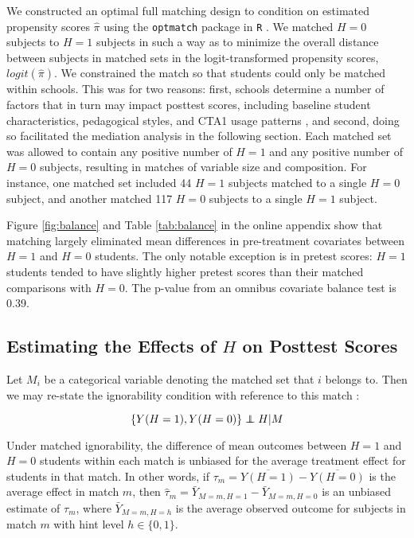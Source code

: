 \documentclass{article}\usepackage[]{graphicx}\usepackage[]{color}
\newenvironment{ass}[2][Assumption:]{\begin{trivlist}
\item[\hskip \labelsep {\bfseries #1}\hskip \labelsep {\bfseries #2}.]}{\end{trivlist}}
\def\independenT#1#2{\mathrel{\rlap{$#1#2$}\mkern2mu{#1#2}}}
\newcommand\independent{\protect\mathpalette{\protect\independenT}{\perp}}
\begin{document}
We constructed an optimal full matching design \citep{hansen2004} to
condition on estimated propensity scores $\hat{\pi}$ using the
\texttt{optmatch} package in \texttt{R} \citep{optmatch}.
We matched $H=0$ subjects to $H=1$ subjects in such a way as
to minimize the overall distance between subjects in matched sets in
the logit-transformed propensity scores, $logit(\hat{\pi})$.
We constrained the match so that students could only be matched within
schools.
This was for two reasons: first, schools determine a number of factors
that in turn may impact posttest scores, including baseline
student characteristics, pedagogical styles, and CTA1 usage patterns
\citep[see][]{descriptivePaper}, and second, doing so facilitated the mediation
analysis in the following section.
Each matched set was allowed to contain any positive number of $H=1$
and any positive number of $H=0$ subjects, resulting in matches of
variable size and composition.
For instance, one matched set included 44 $H=1$ subjects matched to a
single $H=0$ subject, and another matched 117 $H=0$ subjects to a
single $H=1$ subject.

Figure \ref{fig:balance} and Table \ref{tab:balance} in the online appendix show that
matching largely eliminated mean differences in pre-treatment
covariates between $H=1$ and $H=0$ students.
The only notable exception is in pretest scores: $H=1$ students tended
to have slightly higher pretest scores than their matched comparisons
with $H=0$.
The p-value from an omnibus covariate balance test
\citep{covBal} is 0.39.

\subsection{Estimating the Effects of $H$ on Posttest Scores}

Let $M_i$ be a categorical variable denoting the matched set that $i$
belongs to.
Then we may re-state the ignorability condition with reference to this
match \citep[c.f.][]{rebar}:
\begin{ass}{Matched Ignorability}
\begin{equation*}
 \{Y(H=1),Y(H=0)\}\independent H |M
\end{equation*}
\end{ass}
Under matched ignorability, the difference of mean outcomes between $H=1$ and
$H=0$ students within each match is unbiased for the average treatment
effect for students in that match.
In other words, if $\tau_m=\overline{Y(H=1)}-\overline{Y(H=0)}$ is the
average effect in match $m$, then
$\hat{\tau}_m=\bar{Y}_{M=m,H=1}-\bar{Y}_{M=m,H=0}$ is an unbiased
estimate of $\tau_m$, where $\bar{Y}_{M=m,H=h}$ is the average
observed outcome for subjects in match $m$ with hint level
$h\in\{0,1\}$.
\end{document}
